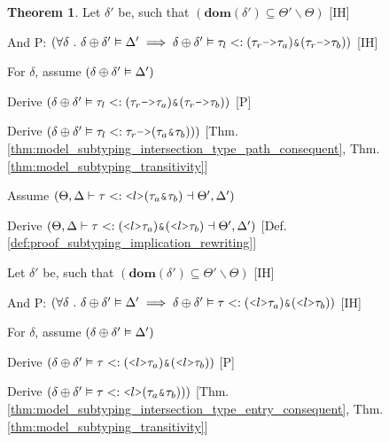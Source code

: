 \documentclass[acmsmall]{acmart}
\theoremstyle{definition}
\newtheorem{theorem}{Theorem}[section]
\begin{document}
\begin{theorem}
  \item \I \N Let $\delta'$ be, such that $(
    \textbf{dom}(\delta') \subseteq \Theta' \backslash \Theta
  )$ [IH]
  \item \I \N And P: $(
    \forall \delta \qua 
    \delta \oplus \delta' \satisfies \Delta' 
    \implies 
    \delta \oplus \delta' \satisfies \tau_l \subtypes 
    (\tau_r\J{->}\tau_a) \J{\&} (\tau_r\J{->}\tau_b)
  )$ [IH]
  \item \I \N For $\delta$, assume $(\delta \oplus \delta' \vDash \Delta')$
  \item \I\I \N Derive $(
    \delta \oplus \delta' \satisfies \tau_l \subtypes
    (\tau_r\J{->}\tau_a) \J{\&} (\tau_r\J{->}\tau_b)
  )$ [P]
  \item \I\I \N Derive $(
    \delta \oplus \delta' \satisfies \tau_l \subtypes \tau_r\J{->}(\tau_a\J{\&}\tau_b))
  )$ [Thm. \ref{thm:model_subtyping_intersection_type_path_consequent}, Thm. \ref{thm:model_subtyping_transitivity}]



  \item \N Assume $(
    \Theta, \Delta \entails 
    \tau \subtypes 
    \J{<} l \J{>} (\tau_{a}\J{\&}\tau_{b})
    \given \Theta', \Delta'
  )$ 
  \item \I \N Derive $(
    \Theta, \Delta \entails 
    \tau
    \subtypes
    (\J{<} l \J{>} \tau_a)
    \J{\&}
    (\J{<} l \J{>} \tau_b)
    \given \Theta', \Delta' 
  )$ [Def. \ref{def:proof_subtyping_implication_rewriting}]

  \item \I \N Let $\delta'$ be, such that $(
    \textbf{dom}(\delta') \subseteq \Theta' \backslash \Theta
  )$ [IH]
  \item \I \N And P: $(
    \forall \delta \qua 
    \delta \oplus \delta' \satisfies \Delta' 
    \implies 
    \delta \oplus \delta' \satisfies 
    \tau
    \subtypes
    (\J{<} l \J{>} \tau_a)
    \J{\&}
    (\J{<} l \J{>} \tau_b)
  )$ [IH]
  \item \I \N For $\delta$, 
    assume $(\delta \oplus \delta' \vDash \Delta')$
  \item \I\I \N Derive $(
    \delta \oplus \delta' \satisfies 
    \tau \subtypes
    (\J{<} l \J{>} \tau_a)
    \J{\&}
    (\J{<} l \J{>} \tau_b)
  )$ [P]
  \item \I\I \N Derive $(
    \delta \oplus \delta' \satisfies \tau \subtypes \J{<} l \J{>}(\tau_a\J{\&}\tau_b))
  )$ [Thm. \ref{thm:model_subtyping_intersection_type_entry_consequent}, Thm. \ref{thm:model_subtyping_transitivity}]


\end{theorem}
\end{document}
